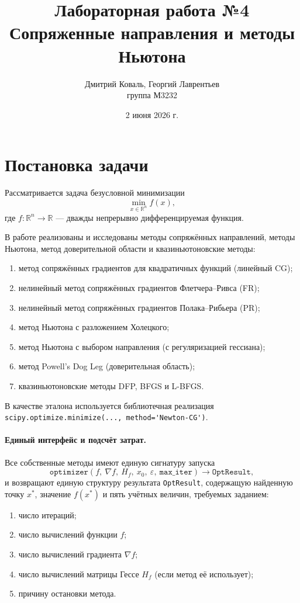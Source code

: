 \documentclass[a4paper,12pt]{article}
\title{Лабораторная работа №4\\Сопряженные направления и методы Ньютона}
\author{
    Дмитрий Коваль, Георгий Лаврентьев\\
    группа М3232
}
\date{2 июня 2026 г.}
\newcommand{\R}{\mathbb{R}}
\newcommand{\grad}{\nabla}
\newcommand{\eps}{\varepsilon}
\theoremstyle{definition}
\begin{document}
\maketitle
\vspace{-20pt}

\section{Постановка задачи}

Рассматривается задача безусловной минимизации
\[
    \min_{x \in \R^n} f(x),
\]
где $f \colon \R^n \to \R$ — дважды непрерывно дифференцируемая функция.

В работе реализованы и исследованы методы сопряжённых направлений, методы Ньютона,
метод доверительной области и квазиньютоновские методы:
\begin{enumerate}
    \item метод сопряжённых градиентов для квадратичных функций (линейный CG);
    \item нелинейный метод сопряжённых градиентов Флетчера--Ривса (FR);
    \item нелинейный метод сопряжённых градиентов Полака--Рибьера (PR);
    \item метод Ньютона с разложением Холецкого;
    \item метод Ньютона с выбором направления (с регуляризацией гессиана);
    \item метод Powell's Dog Leg (доверительная область);
    \item квазиньютоновские методы DFP, BFGS и L-BFGS.
\end{enumerate}
В качестве эталона используется библиотечная реализация \\
\verb|scipy.optimize.minimize(..., method='Newton-CG')|.

\paragraph{Единый интерфейс и подсчёт затрат.}
Все собственные методы имеют единую сигнатуру запуска
\[
    \texttt{optimizer}(f,\ \grad f,\ H_f,\ x_0,\ \eps,\ \texttt{max\_iter}) \longrightarrow \texttt{OptResult},
\]
и возвращают единую структуру результата \texttt{OptResult}, содержащую найденную точку $x^*$,
значение $f(x^*)$ и пять учётных величин, требуемых заданием:
\begin{enumerate}
    \item число итераций;
    \item число вычислений функции $f$;
    \item число вычислений градиента $\grad f$;
    \item число вычислений матрицы Гессе $H_f$ (если метод её использует);
    \item причину остановки метода.
\end{enumerate}
\end{document}
